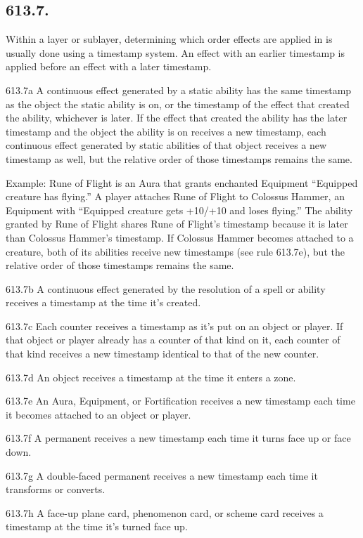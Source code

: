 \subsection*{613.7.}
Within a layer or sublayer, determining which order effects are applied in is usually done using a timestamp system. An effect with an earlier timestamp is applied before an effect with a later timestamp.

613.7a A continuous effect generated by a static ability has the same timestamp as the object the static ability is on, or the timestamp of the effect that created the ability, whichever is later. If the effect that created the ability has the later timestamp and the object the ability is on receives a new timestamp, each continuous effect generated by static abilities of that object receives a new timestamp as well, but the relative order of those timestamps remains the same.

Example: Rune of Flight is an Aura that grants enchanted Equipment “Equipped creature has flying.” A player attaches Rune of Flight to Colossus Hammer, an Equipment with “Equipped creature gets +10/+10 and loses flying.” The ability granted by Rune of Flight shares Rune of Flight’s timestamp because it is later than Colossus Hammer’s timestamp. If Colossus Hammer becomes attached to a creature, both of its abilities receive new timestamps (see rule 613.7e), but the relative order of those timestamps remains the same.

613.7b A continuous effect generated by the resolution of a spell or ability receives a timestamp at the time it’s created.

613.7c Each counter receives a timestamp as it’s put on an object or player. If that object or player already has a counter of that kind on it, each counter of that kind receives a new timestamp identical to that of the new counter.

613.7d An object receives a timestamp at the time it enters a zone.

613.7e An Aura, Equipment, or Fortification receives a new timestamp each time it becomes attached to an object or player.

613.7f A permanent receives a new timestamp each time it turns face up or face down.

613.7g A double-faced permanent receives a new timestamp each time it transforms or converts.

613.7h A face-up plane card, phenomenon card, or scheme card receives a timestamp at the time it’s turned face up.

